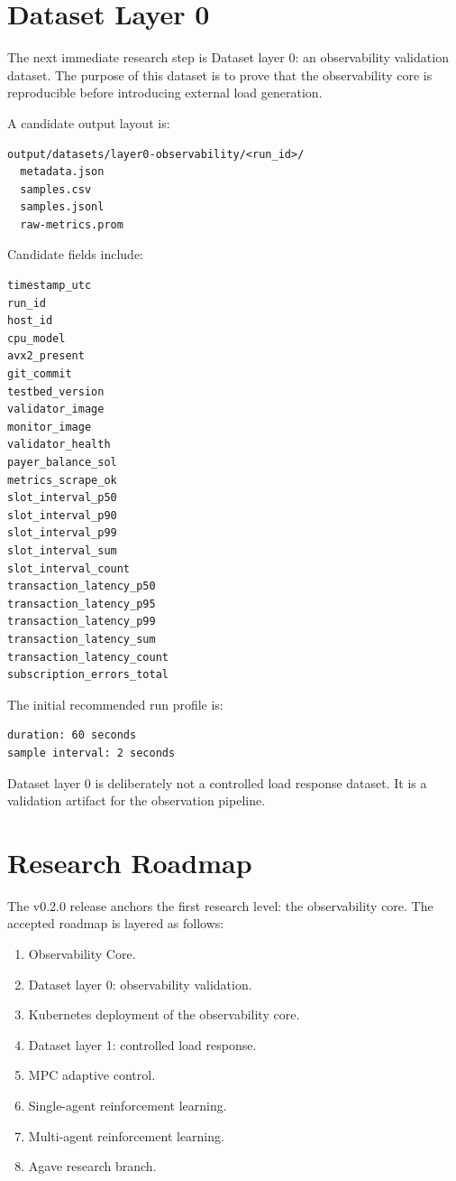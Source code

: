 \documentclass[11pt,a4paper]{article}
\begin{document}
\section{Dataset Layer 0}

The next immediate research step is Dataset layer 0: an observability validation dataset. The purpose of this dataset is to prove that the observability core is reproducible before introducing external load generation.

A candidate output layout is:

\begin{lstlisting}
output/datasets/layer0-observability/<run_id>/
  metadata.json
  samples.csv
  samples.jsonl
  raw-metrics.prom
\end{lstlisting}

Candidate fields include:

\begin{lstlisting}
timestamp_utc
run_id
host_id
cpu_model
avx2_present
git_commit
testbed_version
validator_image
monitor_image
validator_health
payer_balance_sol
metrics_scrape_ok
slot_interval_p50
slot_interval_p90
slot_interval_p99
slot_interval_sum
slot_interval_count
transaction_latency_p50
transaction_latency_p95
transaction_latency_p99
transaction_latency_sum
transaction_latency_count
subscription_errors_total
\end{lstlisting}

The initial recommended run profile is:

\begin{lstlisting}
duration: 60 seconds
sample interval: 2 seconds
\end{lstlisting}

Dataset layer 0 is deliberately not a controlled load response dataset. It is a validation artifact for the observation pipeline.

\section{Research Roadmap}

The v0.2.0 release anchors the first research level: the observability core. The accepted roadmap is layered as follows:

\begin{enumerate}[leftmargin=2em]
  \item Observability Core.
  \item Dataset layer 0: observability validation.
  \item Kubernetes deployment of the observability core.
  \item Dataset layer 1: controlled load response.
  \item MPC adaptive control.
  \item Single-agent reinforcement learning.
  \item Multi-agent reinforcement learning.
  \item Agave research branch.
\end{enumerate}
\end{document}
